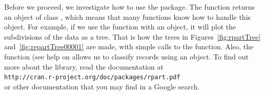 Before we proceed, we investigate how to use the 
 package.
The  function returns an object of class
, which means that many functions
know how to handle this object. 
For example, if we use the  function 
with an  object,
it will plot the subdivisions of the data as a tree. 
That is how the trees in Figures~\ref{fig:rpartTree}
and~\ref{fig:repartTree00001} are made, with simple
calls to the  function.
Also, the  function (see help
on  allows us to 
classify records using an  object.
To find out more about the 
library, read the documentation at\\
\texttt{http://cran.r-project.org/doc/packages/rpart.pdf}\\
or other documentation that you may find in a Google search.


